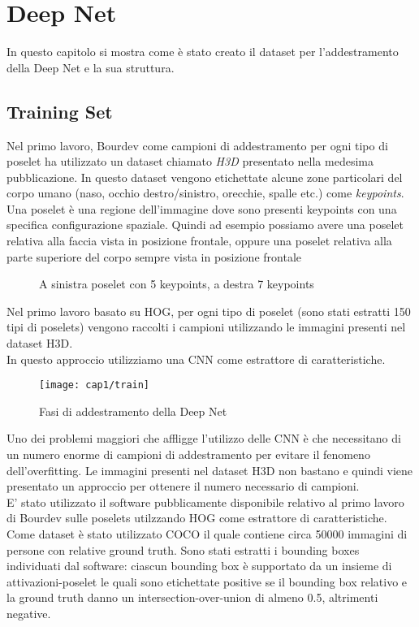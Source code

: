 \chapter{Deep Net} \label{cap1}
In questo capitolo si mostra come è stato creato il dataset per l'addestramento della Deep Net e la sua struttura.
\section{Training Set}
Nel primo lavoro, Bourdev come campioni di addestramento per ogni tipo di poselet ha utilizzato un dataset chiamato \textit{H3D} presentato nella medesima pubblicazione. In questo dataset vengono etichettate alcune zone particolari del corpo umano (naso, occhio destro/sinistro, orecchie, spalle etc.) come \textit{keypoints}. Una poselet è una regione dell'immagine dove sono presenti keypoints con una specifica configurazione spaziale. Quindi ad esempio possiamo avere una poselet relativa alla faccia vista in posizione frontale, oppure una poselet relativa alla parte superiore del corpo sempre vista in posizione frontale

\begin{figure}[h!b]
 \centering
 \hspace{5mm}
 \caption{A sinistra poselet con 5 keypoints, a destra 7 keypoints}
 \end{figure}
 
 Nel primo lavoro basato su HOG, per ogni tipo di poselet (sono stati estratti 150 tipi di poselets\cite{poselets-image}) vengono raccolti i campioni utilizzando le immagini presenti nel dataset H3D.\\
 In questo approccio utilizziamo una CNN come estrattore di caratteristiche.
 
 \begin{figure}[h!b]
 \centering
 \texttt{[image: cap1/train]}
 \caption{Fasi di addestramento della Deep Net}
 \label{}
 \end{figure}
 
 
 
 Uno dei problemi maggiori che affligge l'utilizzo delle CNN è che necessitano di un numero enorme di campioni di addestramento per evitare il fenomeno dell'overfitting. Le immagini presenti nel dataset H3D non bastano e quindi viene presentato un approccio per ottenere il numero necessario di campioni.\\
 E' stato utilizzato il software pubblicamente disponibile\cite{poselet-code} relativo al primo lavoro di Bourdev sulle poselets utilzzando HOG come estrattore di caratteristiche. Come dataset è stato utilizzato COCO\cite{coco} il quale contiene circa 50000 immagini di persone con relative ground truth. Sono stati estratti i bounding boxes individuati dal software: ciascun bounding box è supportato da un insieme di attivazioni-poselet le quali sono etichettate positive se il bounding box relativo e la ground truth danno un intersection-over-union di almeno 0.5, altrimenti negative.
 
